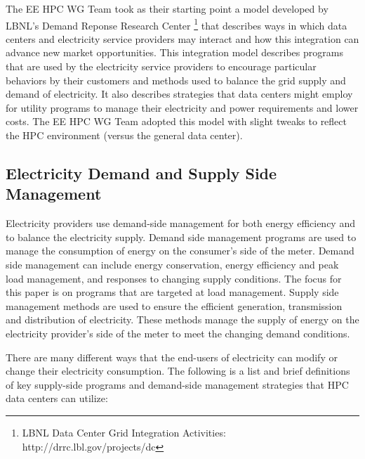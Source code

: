 The EE HPC WG Team took as their starting point a model developed by LBNL's 
Demand Reponse Research Center \footnote{LBNL
Data Center Grid Integration Activities: http://drrc.lbl.gov/projects/dc} that
describes ways in which data centers and electricity service providers may
interact and how this integration can advance new market opportunities. This
integration model describes programs that are used by the electricity service
providers to encourage particular behaviors by their customers and methods used
to balance the grid supply and demand of electricity. It also describes
strategies that data centers might employ for utility programs to manage their
electricity and power requirements and lower costs. The EE HPC WG Team adopted
this model with slight tweaks to reflect the HPC environment (versus the
general data center).


\subsection{Electricity Demand and Supply Side Management}

Electricity providers use demand-side management for both energy efficiency and to balance the electricity supply. 
Demand side management programs are used to manage the consumption of energy on the consumer’s side of the meter.  
Demand side management can include energy conservation, energy efficiency and peak load management, and responses to 
changing supply conditions.  The focus for this paper is on programs that are targeted at load management. 
Supply side management methods are used to ensure the efficient generation, transmission and distribution of 
electricity.  These methods 
manage the supply of energy on the electricity provider’s side of the meter to meet the changing demand conditions. 

There are many different ways that the end-users of electricity can modify or change their electricity consumption. 
The following is a list and 
brief definitions of key supply-side programs and demand-side management strategies that HPC data centers can utilize:




